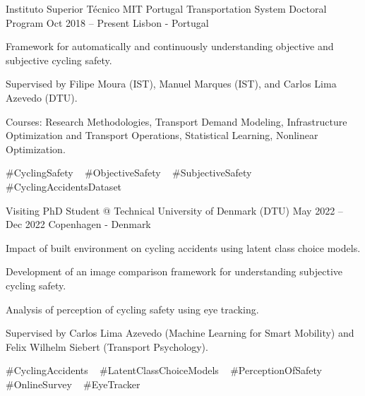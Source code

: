 

\begin{cventries}





  \cventry
    {Instituto Superior Técnico} %
    {MIT Portugal Transportation System Doctoral Program} %
    {Oct 2018 – Present} %
    {Lisbon - Portugal} %
    {
      \begin{cvitems} %
        \item {Framework for automatically and continuously understanding objective and subjective cycling safety.}
        \item {Supervised by Filipe Moura (IST), Manuel Marques (IST), and Carlos Lima Azevedo (DTU).}
        \item {Courses: Research Methodologies, Transport Demand Modeling, Infrastructure Optimization and Transport Operations, Statistical Learning, Nonlinear Optimization.}
      \end{cvitems}
    }
    {
      \#CyclingSafety ~
      \#ObjectiveSafety ~
      \#SubjectiveSafety ~
      \#CyclingAccidentsDataset ~
    }

  \cventryinner
    {Visiting PhD Student @ Technical University of Denmark (DTU)} %
    {May 2022 – Dec 2022} %
    {Copenhagen - Denmark} %
    {
      \begin{cvitems} %
        \item {Impact of built environment on cycling accidents using latent class choice models.}
        \item {Development of an image comparison framework for understanding subjective cycling safety.}
        \item {Analysis of perception of cycling safety using eye tracking.}
        \item {Supervised by Carlos Lima Azevedo (Machine Learning for Smart Mobility) and Felix Wilhelm Siebert (Transport Psychology).}
      \end{cvitems}
    }
    {
      \#CyclingAccidents ~
      \#LatentClassChoiceModels ~
      \#PerceptionOfSafety ~
      \#OnlineSurvey ~
      \#EyeTracker    
    }


\end{cventries}
